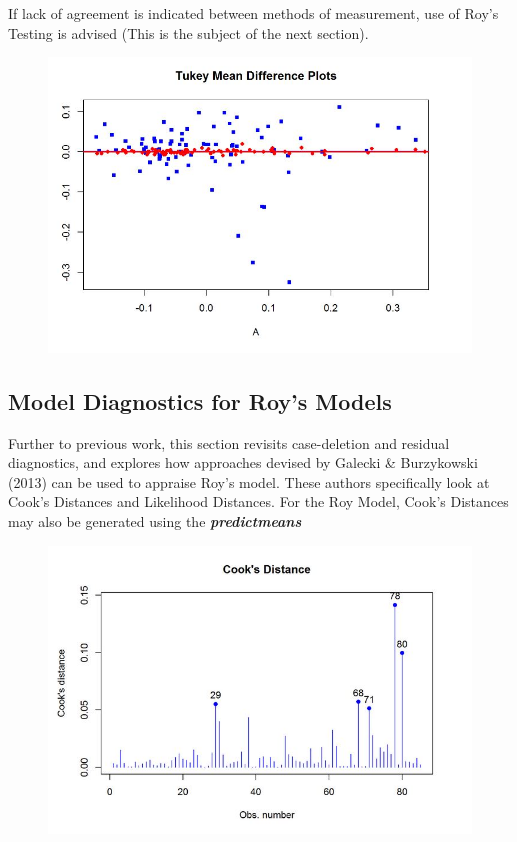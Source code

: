 \documentclass[12pt, a4paper]{report}
\theoremstyle{plain}
\theoremstyle{definition}
\theoremstyle{remark}
\begin{document}
	If lack of agreement is indicated between methods of measurement, use of Roy's Testing is advised (This is the subject of the next section).
	\begin{figure}[h1]
		\centering
		\includegraphics[width=0.7\linewidth]{images/04-TMDplot}
		
	\end{figure}
	

	
	
	
	

	



	\subsection{Model Diagnostics for Roy's Models}
	
	
	Further to previous work, this section revisits case-deletion and residual diagnostics, and explores how approaches devised by  Galecki \& Burzykowski (2013) can be used to appraise Roy's model. These authors specifically look at Cook's Distances and Likelihood Distances.
	For the Roy Model, Cook's Distances may also be generated using the \textbf{\textit{predictmeans}}
	
	
	
	\begin{figure}[h!]
		\centering
		\includegraphics[width=0.7\linewidth]{images/CooksDistancePlot-JS-Roy}
		\caption{}
		\label{fig:CooksDistancePlot-JS-Roy}
	\end{figure}
\end{document}
